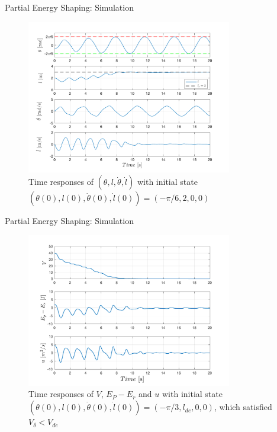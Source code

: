 \documentclass[10pt]{beamer}
\begin{document}
  \begin{frame}{Partial Energy Shaping: Simulation}
    \begin{figure}
      \caption*{Time responses of $(\theta, l, \dot{\theta}, \dot{l})$ with 
        initial state $(\theta(0), l(0), \dot{\theta}(0), \dot{l}(0))=
        (-\pi/6, 2, 0, 0)$}
      \vspace{-0.3cm}
      \includegraphics[width=0.8\textwidth]{images/partial_2.pdf}
    \end{figure}
  \end{frame}

  \begin{frame}{Partial Energy Shaping: Simulation}
    \begin{figure}
      \caption*{Time responses of $V$, $E_P-E_r$ and $u$ with initial state 
        $(\theta(0), l(0), \dot{\theta}(0), \dot{l}(0))=(-\pi/3, l_{de}, 0,
        0)$, which satisfied $V_\delta < V_{de}$}
      \vspace{-0.3cm}
      \includegraphics[width=0.8\textwidth]{images/partial_1b.pdf}
    \end{figure}
  \end{frame}
\end{document}
